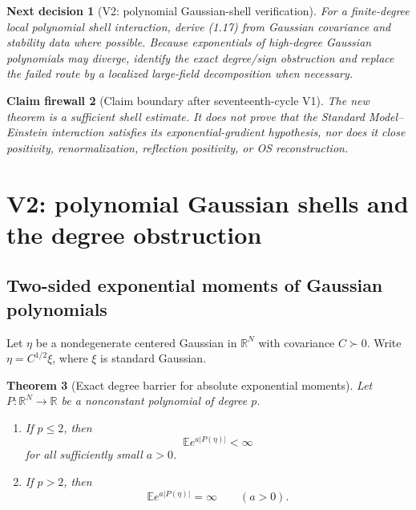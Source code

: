 \documentclass[11pt]{article}
\newtheorem{theorem}{Theorem}[section]
\newtheorem{firewall}[theorem]{Claim firewall}
\newtheorem{decision}[theorem]{Next decision}
\theoremstyle{remark}
\begin{document}
\begin{decision}[V2: polynomial Gaussian-shell verification]
\label{dec:v17v1-next}
For a finite-degree local polynomial shell interaction, derive
(1.17) from Gaussian covariance and stability data where possible.
Because exponentials of high-degree Gaussian polynomials may diverge,
identify the exact degree/sign obstruction and replace the failed
route by a localized large-field decomposition when necessary.
\end{decision}

\begin{firewall}[Claim boundary after seventeenth-cycle V1]
\label{fire:v17v1}
The new theorem is a sufficient shell estimate.  It does not prove
that the Standard Model--Einstein interaction satisfies its
exponential-gradient hypothesis, nor does it close positivity,
renormalization, reflection positivity, or OS reconstruction.
\end{firewall}


\section{V2: polynomial Gaussian shells and the degree obstruction}
\label{sec:v17v2}

\subsection{Two-sided exponential moments of Gaussian polynomials}

Let \(\eta\) be a nondegenerate centered Gaussian in
\(\mathbb R^N\) with covariance \(C\succ0\).  Write
\(\eta=C^{1/2}\xi\), where \(\xi\) is standard Gaussian.

\begin{theorem}[Exact degree barrier for absolute exponential
moments]
\label{thm:v17v2-degree}
Let \(P:\mathbb R^N\to\mathbb R\) be a nonconstant polynomial of
degree \(p\).
\begin{enumerate}
\item If \(p\leq2\), then
      \[
      {\mathbb E}e^{a|P(\eta)|}<\infty              \tag{2.1}
      \]
      for all sufficiently small \(a>0\).
\item If \(p>2\), then
      \[
      {\mathbb E}e^{a|P(\eta)|}=\infty
      \qquad(a>0).                                  \tag{2.2}
      \]
\end{enumerate}
\end{theorem}
\end{document}
